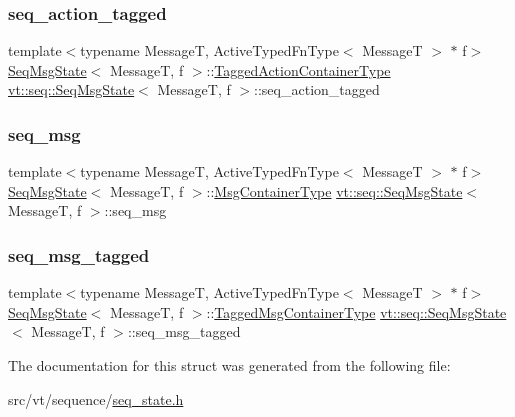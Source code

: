 \subsubsection{\texorpdfstring{seq\+\_\+action\+\_\+tagged}{seq\_action\_tagged}}
{\footnotesize\ttfamily template$<$typename MessageT, Active\+Typed\+Fn\+Type$<$ Message\+T $>$ $\ast$ f$>$ \\
\hyperlink{structvt_1_1seq_1_1_seq_msg_state}{Seq\+Msg\+State}$<$ MessageT, f $>$\+::\hyperlink{structvt_1_1seq_1_1_seq_msg_state_a0f9787d4224b8017484093f967200209}{Tagged\+Action\+Container\+Type} \hyperlink{structvt_1_1seq_1_1_seq_msg_state}{vt\+::seq\+::\+Seq\+Msg\+State}$<$ MessageT, f $>$\+::seq\+\_\+action\+\_\+tagged\hspace{0.3cm}{\ttfamily [static]}}

\mbox{\label{structvt_1_1seq_1_1_seq_msg_state_a28b0d568f25cb87c942213b6c89e8cd9}} 
\subsubsection{\texorpdfstring{seq\+\_\+msg}{seq\_msg}}
{\footnotesize\ttfamily template$<$typename MessageT, Active\+Typed\+Fn\+Type$<$ Message\+T $>$ $\ast$ f$>$ \\
\hyperlink{structvt_1_1seq_1_1_seq_msg_state}{Seq\+Msg\+State}$<$ MessageT, f $>$\+::\hyperlink{structvt_1_1seq_1_1_seq_msg_state_a6821f61ac6a41b210001f49224ed4c9e}{Msg\+Container\+Type} \hyperlink{structvt_1_1seq_1_1_seq_msg_state}{vt\+::seq\+::\+Seq\+Msg\+State}$<$ MessageT, f $>$\+::seq\+\_\+msg\hspace{0.3cm}{\ttfamily [static]}}

\mbox{\label{structvt_1_1seq_1_1_seq_msg_state_ae18d41c6d80d485db4aecf3e6fc9ca28}} 
\subsubsection{\texorpdfstring{seq\+\_\+msg\+\_\+tagged}{seq\_msg\_tagged}}
{\footnotesize\ttfamily template$<$typename MessageT, Active\+Typed\+Fn\+Type$<$ Message\+T $>$ $\ast$ f$>$ \\
\hyperlink{structvt_1_1seq_1_1_seq_msg_state}{Seq\+Msg\+State}$<$ MessageT, f $>$\+::\hyperlink{structvt_1_1seq_1_1_seq_msg_state_a57de558c4a7efb36b5358117c6f6d4c5}{Tagged\+Msg\+Container\+Type} \hyperlink{structvt_1_1seq_1_1_seq_msg_state}{vt\+::seq\+::\+Seq\+Msg\+State}$<$ MessageT, f $>$\+::seq\+\_\+msg\+\_\+tagged\hspace{0.3cm}{\ttfamily [static]}}



The documentation for this struct was generated from the following file\+:\begin{DoxyCompactItemize}
\item 
src/vt/sequence/\hyperlink{seq__state_8h}{seq\+\_\+state.\+h}\end{DoxyCompactItemize}
